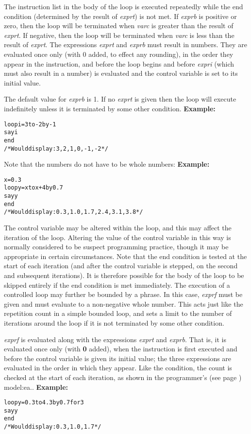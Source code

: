 \begin{description}
The instruction list in the body of the loop is executed repeatedly
while the end condition (determined by the result of \emph{exprt})
is not met.
If \emph{exprb} is positive or zero, then the loop will be
terminated when \emph{varc} is greater than the result of
\emph{exprt}.
If negative, then the loop will be terminated when \emph{varc} is
less than the result of \emph{exprt}.
 The expressions \emph{exprt} and \emph{exprb} must result in
numbers.
They are evaluated once only (with 0 added, to effect any
rounding), in the order they appear in the instruction, and before the
loop begins and before \emph{expri} (which must also result in a
number) is evaluated and the control variable is set to its initial
value.
 
The default value for \emph{exprb} is 1.
If no \emph{exprt} is given then the loop will execute indefinitely
unless it is terminated by some other condition.
 \textbf{Example:}
\begin{alltt}
loop i=3 to -2 by -1
  say i
  end
/* Would display: 3, 2, 1, 0, -1, -2 */
\end{alltt}
Note that the numbers do not have to be whole numbers:
 \textbf{Example:}
\begin{alltt}
x=0.3
loop y=x to x+4 by 0.7
  say y
  end
/* Would display: 0.3, 1.0, 1.7, 2.4, 3.1, 3.8 */
\end{alltt}
 The control variable may be altered within the loop, and this may
affect the iteration of the loop.
Altering the value of the control variable in this way is normally
considered to be suspect programming practice, though it may be
appropriate in certain circumstances.
 Note that the end condition is tested at the start of each iteration
(and after the control variable is stepped, on the second and
subsequent iterations).  It is therefore possible for the body of the
loop to be skipped entirely if the end condition is met immediately.
 The execution of a controlled loop may further be bounded by a
 phrase.
In this case, \emph{exprf} must be given and must evaluate to a
non-negative whole number.
This acts just like the repetition count in a simple bounded loop, and
sets a limit to the number of iterations around the loop if it is not
terminated by some other condition.
 
\emph{exprf} is evaluated along with the expressions
\emph{exprt} and \emph{exprb}.
That is, it is evaluated once only (with \textbf{0} added), when the
 instruction is first executed and before the control
variable is given its initial value; the three expressions are evaluated
in the order in which they appear.
Like the  condition, the  count is checked at the
start of each iteration, as shown in the  programmer's (see page \pageref{refloopmod}) 
model:ea..
 \textbf{Example:}
\begin{alltt}
loop y=0.3 to 4.3 by 0.7 for 3
  say y
  end
/* Would display: 0.3, 1.0, 1.7 */
\end{alltt}
 

\end{description}
